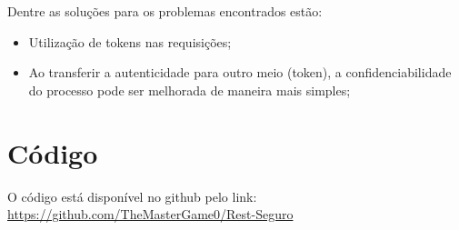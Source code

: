 \documentclass[12pt]{article}
\begin{document}
Dentre as soluções para os problemas encontrados estão:
\begin{itemize}
  \item Utilização de tokens nas requisições;
  \item Ao transferir a autenticidade para outro meio (token), a confidenciabilidade do processo pode ser melhorada de maneira mais simples;
\end{itemize}




\section{Código}
O código está disponível no github pelo link: \href{https://github.com/TheMasterGame0/Rest-Seguro}{https://github.com/TheMasterGame0/Rest-Seguro}
\end{document}
